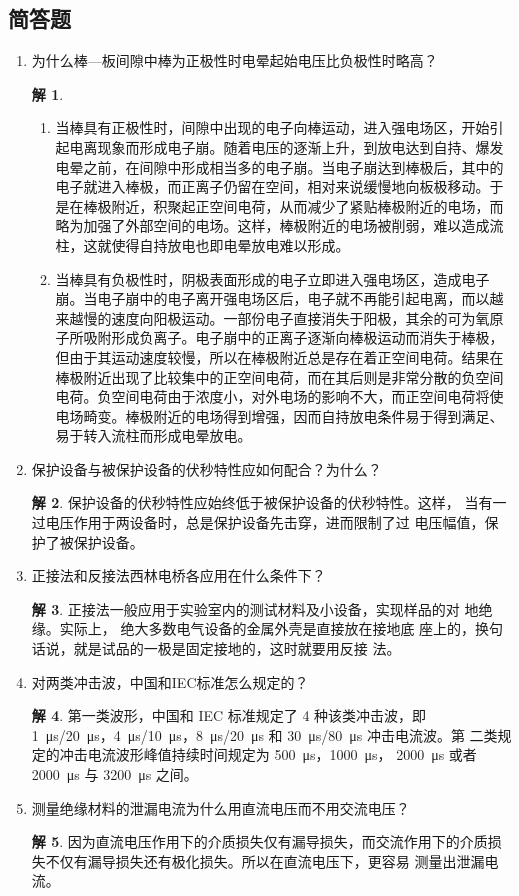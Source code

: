 \documentclass[zihao=-4,fontset = none]{ctexart}
\theoremstyle{definition}
\newtheorem*{solution}{解}
\begin{document}
\subsection{简答题}
\begin{enumerate}
  \item 为什么棒—板间隙中棒为正极性时电晕起始电压比负极性时略高？
  \begin{solution}
    \begin{enumerate}
      \item 当棒具有正极性时，间隙中出现的电子向棒运动，进入强电场区，开始引起电离现象而形成电子崩。随着电压的逐渐上升，到放电达到自持、爆发电晕之前，在间隙中形成相当多的电子崩。当电子崩达到棒极后，其中的电子就进入棒极，而正离子仍留在空间，相对来说缓慢地向板极移动。于是在棒极附近，积聚起正空间电荷，从而减少了紧贴棒极附近的电场，而略为加强了外部空间的电场。这样，棒极附近的电场被削弱，难以造成流柱，这就使得自持放电也即电晕放电难以形成。 
      \item 当棒具有负极性时，阴极表面形成的电子立即进入强电场区，造成电子崩。当电子崩中的电子离开强电场区后，电子就不再能引起电离，而以越来越慢的速度向阳极运动。一部份电子直接消失于阳极，其余的可为氧原子所吸附形成负离子。电子崩中的正离子逐渐向棒极运动而消失于棒极，但由于其运动速度较慢，所以在棒极附近总是存在着正空间电荷。结果在棒极附近出现了比较集中的正空间电荷，而在其后则是非常分散的负空间电荷。负空间电荷由于浓度小，对外电场的影响不大，而正空间电荷将使电场畸变。棒极附近的电场得到增强，因而自持放电条件易于得到满足、易于转入流柱而形成电晕放电。
    \end{enumerate}
  \end{solution}
  \item 保护设备与被保护设备的伏秒特性应如何配合？为什么？
  \begin{solution}
    保护设备的伏秒特性应始终低于被保护设备的伏秒特性。这样，
    当有一过电压作用于两设备时，总是保护设备先击穿，进而限制了过
    电压幅值，保护了被保护设备。
  \end{solution}
  \item 正接法和反接法西林电桥各应用在什么条件下？
  \begin{solution}
    正接法一般应用于实验室内的测试材料及小设备，实现样品的对
    地绝缘。实际上， 绝大多数电气设备的金属外壳是直接放在接地底
    座上的，换句话说，就是试品的一极是固定接地的，这时就要用反接
    法。
  \end{solution}
  \item 对两类冲击波，中国和IEC标准怎么规定的？
  \begin{solution}
    第一类波形，中国和 IEC 标准规定了 4 种该类冲击波，即 \SI{1}{μs}/\SI{20}{μs}，\SI{4}{μs}/\SI{10}{μs}，\SI{8}{μs}/\allowbreak\SI{20}{μs} 和 \SI{30}{μs}/\SI{80}{μs} 冲击电流波。第
    二类规定的冲击电流波形峰值持续时间规定为 \SI{500}{μs}，\SI{1000}{μs}，
    \SI{2000}{μs} 或者 \SI{2000}{μs} 与 \SI{3200}{μs} 之间。
  \end{solution}
  \item 测量绝缘材料的泄漏电流为什么用直流电压而不用交流电压？
  \begin{solution}
    因为直流电压作用下的介质损失仅有漏导损失，而交流作用下的介质损失不仅有漏导损失还有极化损失。所以在直流电压下，更容易
    测量出泄漏电流。
  \end{solution}
\end{enumerate}
\end{document}
